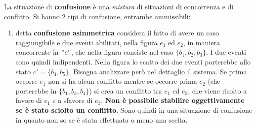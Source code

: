 \begin{definizione}
  La situazione di \textbf{confusione} è una \textit{mistura} di situazioni di
  concorrenza e di conflitto. Si hanno 2 tipi di confusione, entrambe
  ammissibili: 
  \begin{enumerate}
    \item detta \textbf{confusione asimmetrica} considera il fatto di avere un
    caso raggiungibile e due eventi abilitati, nella figura $e_1$ ed $e_2$, in
    maniera concorrente in $"c"$, che nella figura consiste nel caso
    $\{b_1, b_2, b_3\}$. I due eventi sono quindi indipendenti. Nella figura lo
    scatto dei due eventi porterebbe allo stato $c'=\{b_4, b_5\}$. Bisogna
    analizzare però nel dettaglio il sistema. Se prima occorre $e_1$ non si ha
    alcun conflitto mentre se occorre prima $e_2$ (che porterebbe in
    $\{b_1, b_3, b_4\}$) si crea un conflitto tra $e_1$ ed $e_3$, che viene
    risolto a favore di $e_1$ e a sfavore di $e_3$. \textbf{Non è possibile
      stabilire oggettivamente se è stato sciolto un conflitto}. Sono quindi in
    una situazione di confusione in quanto non so se è stata effettuata o meno
    una scelta.
    \begin{figure}[H]
      \centering
\end{figure}
\end{enumerate}
\end{definizione}

